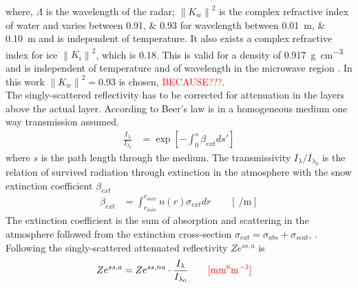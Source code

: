 where, $\Lambda$ is the wavelength of the radar; $\left\| K_w \right\|^2$ is the complex refractive index of water and varies between \numlist{0.91;0.93} for wavelength between \SIlist{0.01;0.10}{\metre} and is independent of temperature. It also exists a  complex refractive index for ice $\left\| K_i \right\|^2$, which is \SI{0.18}{}. This is valid for a density of \SI{0.917}{\gram\per\cubic\cm} and is independent of temperature and of wavelength in the microwave region \citep{doviak_doppler_1993}. In this work  $\left\| K_w \right\|^2 = 0.93$ is chosen, \textcolor{red}{BECAUSE???}. 
\\
The singly-scattered reflectivity has to be corrected for attenuation in the layers above the actual layer. According to Beer's law is in a homogeneous medium one way transmission assumed. 
\begin{align}
	\frac{I_{\lambda}}{I_{\lambda_0}} & = \exp \left[ - \int_0^s \beta_{ext} ds'\right] \label{eq:Beer}
\end{align}
where $s$ is the path length through the medium. The transmissivity $I_{\lambda}/I_{\lambda_0}$ is the relation of survived radiation through extinction in the atmosphere with the snow extinction coefficient $\beta_{ext}$
\begin{align}
	\beta_{ext} & = \int_{r_{min}}^{r_{max}} n(r) \sigma_{ext} dr \qquad [\SI{}{\per\metre}] \label{eq:bext}
\end{align}
The extinction coefficient is the sum of absorption and scattering in the atmosphere followed from the extinction cross-section $\sigma_{ext} = \sigma_{abs} + \sigma_{scat}$, \citep{lohmann_introduction_2016,lamb_physics_2011}. \textcolor{red}{\cite[Eq. 12.1 and more][]{lohmann_introduction_2016}} \\
Following  the singly-scattered attenuated reflectivity $Ze^{ss, a}$ is
\begin{align}
	Ze^{ss, a} & = Ze^{ss, na} \cdot \frac{I_{\lambda}}{I_{\lambda_0}} \qquad \textcolor{red}{[\SI{}{\mm^6\metre^{-3}}]} \label{eq:sing_scatt_att_Z}
\end{align}
